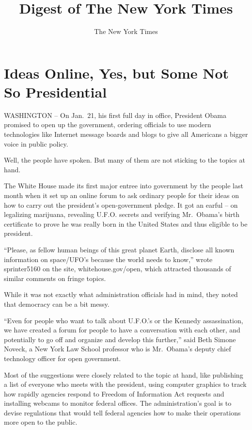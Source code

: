 ﻿\documentclass[12pt]{article}
\title{Digest of The New York Times}
\author{The New York Times}
\begin{document}
\date{}
\thispagestyle{empty}
\renewcommand\contentsname{\textsf{Digest of The New York Times}}
{\footnotesize\textsf{\tableofcontents}}
\clearpage
\setcounter{page}{1}
\section{Ideas Online, Yes, but Some Not So Presidential}

WASHINGTON -- On Jan.~21, his first full day in office, President Obama promised to open up the
government, ordering officials to use modern technologies like Internet message boards and blogs to
give all Americans a bigger voice in public policy.

Well, the people have spoken. But many of them are not sticking to the topics at hand.

The White House made its first major entree into government by the people last month when it set up
an online forum to ask ordinary people for their ideas on how to carry out the president's
open-government pledge. It got an earful -- on legalizing marijuana, revealing U.F.O. secrets and
verifying Mr.~Obama's birth certificate to prove he was really born in the United States and thus
eligible to be president.

``Please, as fellow human beings of this great planet Earth, disclose all known information on
space/UFO's because the world needs to know,'' wrote sprinter5160 on the site, whitehouse.gov/open,
which attracted thousands of similar comments on fringe topics.

While it was not exactly what administration officials had in mind, they noted that democracy can be
a bit messy.

``Even for people who want to talk about U.F.O.'s or the Kennedy assassination, we have created a
forum for people to have a conversation with each other, and potentially to go off and organize and
develop this further,'' said Beth Simone Noveck, a New York Law School professor who is Mr.~Obama's
deputy chief technology officer for open government.

Most of the suggestions were closely related to the topic at hand, like publishing a list of
everyone who meets with the president, using computer graphics to track how rapidly agencies respond
to Freedom of Information Act requests and installing webcams to monitor federal offices. The
administration's goal is to devise regulations that would tell federal agencies how to make their
operations more open to the public.
\end{document}
